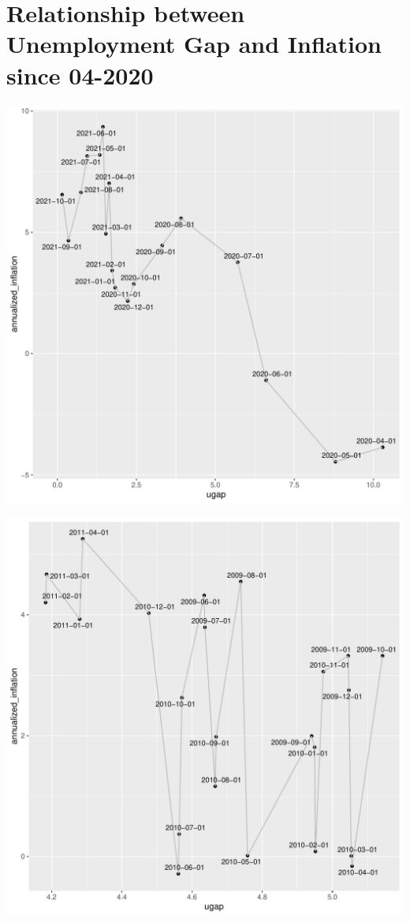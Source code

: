 \documentclass{article}\usepackage[]{graphicx}\usepackage[]{color}
\makeatletter
\def\maxwidth{ %
  \ifdim\Gin@nat@width>\linewidth
    \linewidth
  \else
    \Gin@nat@width
  \fi
}
\newenvironment{knitrout}{}{} %
\makeatother
\begin{document}
\section{Relationship between Unemployment Gap and Inflation since 04-2020}

\begin{knitrout}
\color{fgcolor}
\includegraphics[width=\maxwidth]{figure/unnamed-chunk-1-1} 

\includegraphics[width=\maxwidth]{figure/unnamed-chunk-1-2} 


\end{knitrout}
\end{document}

